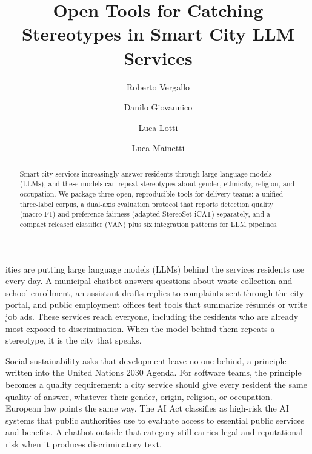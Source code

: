 \documentclass{IEEEcsmag}
\begin{document}

\title{Open Tools for Catching Stereotypes in Smart City LLM Services}

\author{Roberto Vergallo}

\author{Danilo Giovannico}

\author{{L}uca Lotti}

\author{{L}uca Mainetti}


\begin{abstract}
Smart city services increasingly answer residents through large language models (LLMs), and these models can repeat stereotypes about gender, ethnicity, religion, and occupation. We package three open, reproducible tools for delivery teams: a unified three-label corpus, a dual-axis evaluation protocol that reports detection quality (macro-F1) and preference fairness (adapted StereoSet iCAT) separately, and a compact released classifier (VAN) plus six integration patterns for LLM pipelines.
\end{abstract}

\maketitle

ities are putting large language models (LLMs) behind the services residents use every day. A municipal chatbot answers questions about waste collection and school enrollment, an assistant drafts replies to complaints sent through the city portal, and public employment offices test tools that summarize r\'esum\'es or write job ads. These services reach everyone, including the residents who are already most exposed to discrimination. When the model behind them repeats a stereotype, it is the city that speaks.

Social sustainability asks that development leave no one behind, a principle written into the United Nations 2030 Agenda.\cite{un2030} For software teams, the principle becomes a quality requirement: a city service should give every resident the same quality of answer, whatever their gender, origin, religion, or occupation. European law points the same way. The AI Act classifies as high-risk the AI systems that public authorities use to evaluate access to essential public services and benefits.\cite{aiact} A chatbot outside that category still carries legal and reputational risk when it produces discriminatory text.
\end{document}
